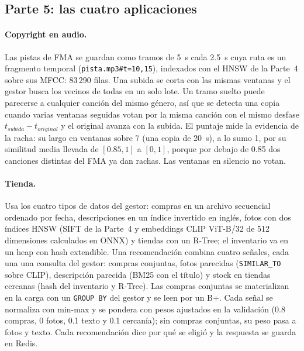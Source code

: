 \subsection{Parte 5: las cuatro aplicaciones}

\paragraph{Copyright en audio.} Las pistas de FMA se guardan como tramos de 5~s cada
2.5~s cuya ruta es un fragmento temporal (\texttt{pista.mp3\#t=10,15}), indexados con el HNSW
de la Parte~4 sobre sus MFCC: 83\,290 filas. Una subida se corta con las mismas ventanas y
el gestor busca los vecinos de todas en un solo lote. Un tramo suelto puede parecerse a
cualquier canción del mismo género, así que se detecta una copia cuando varias ventanas
seguidas votan por la misma canción con el mismo desfase $t_{subida} - t_{original}$ y el
original avanza con la subida. El puntaje mide la evidencia de la racha: su largo en
ventanas sobre 7 (una copia de 20~s), a lo sumo 1, por su similitud media llevada de
$[0.85, 1]$ a $[0, 1]$, porque por debajo de 0.85 dos canciones distintas del FMA ya dan
rachas. Las ventanas en silencio no votan.

\paragraph{Tienda.} Usa los cuatro tipos de datos del gestor: compras en un archivo
secuencial ordenado por fecha, descripciones en un índice invertido en inglés, fotos con
dos índices HNSW (SIFT de la Parte~4 y embeddings CLIP ViT-B/32 de 512 dimensiones
calculados en ONNX) y tiendas con un R-Tree; el inventario va en un heap con hash
extendible. Una recomendación combina cuatro señales, cada una una consulta del gestor:
compras conjuntas, fotos parecidas (\texttt{SIMILAR\_TO} sobre CLIP), descripción parecida
(BM25 con el título) y stock en tiendas cercanas (hash del inventario y R-Tree). Las compras
conjuntas se materializan en la carga con un \texttt{GROUP BY} del gestor y se leen por un
B+. Cada señal se normaliza con min-max y se pondera con pesos ajustados en la validación
(0.8 compras, 0 fotos, 0.1 texto y 0.1 cercanía); sin compras conjuntas, su peso pasa a
fotos y texto. Cada recomendación dice
por qué se eligió y la respuesta se guarda en Redis.

